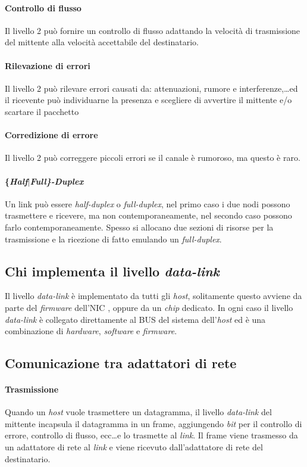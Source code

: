         \paragraph{Controllo di flusso} Il livello 2 può fornire un controllo di flusso adattando la velocità di trasmissione del mittente alla velocità accettabile del destinatario.
        \paragraph{Rilevazione di errori} Il livello 2 può rilevare errori causati da: attenuazioni, rumore e interferenze,\dots ed il ricevente può individuarne la presenza e scegliere di avvertire il mittente e/o scartare il pacchetto
        \paragraph{Corredizione di errore} Il livello 2 può correggere piccoli errori se il canale è rumoroso, ma questo è raro.
        \paragraph{\{\textit{Half}$\mid$\textit{Full\}-Duplex}} Un link può essere \textit{half-duplex} o \textit{full-duplex}, nel primo caso i due nodi possono trasmettere e ricevere, ma non contemporaneamente, nel secondo caso possono farlo contemporaneamente. Spesso si allocano due sezioni di risorse per la trasmissione e la ricezione di fatto emulando un \textit{full-duplex}.
    \subsection{Chi implementa il livello \textit{data-link}}
        Il livello \textit{data-link} è implementato da tutti gli \textit{host}, solitamente questo avviene da parte del \textit{firmware} dell'\Acrfull*{NIC} , oppure da un \textit{chip} dedicato. In ogni caso il livello \textit{data-link} è collegato direttamente al \Acrshort*{BUS} del sistema dell'\textit{host} ed è una combinazione di \textit{hardware}, \textit{software} e \textit{firmware}.
    \subsection{Comunicazione tra adattatori di rete} 
        \paragraph{Trasmissione} Quando un \textit{host} vuole trasmettere un datagramma, il livello \textit{data-link} del mittente incapsula il datagramma in un frame, aggiungendo \textit{bit} per il controllo di errore, controllo di flusso, ecc\dots e lo trasmette al \textit{link}. Il frame viene trasmesso da un adattatore di rete al \textit{link} e viene ricevuto dall'adattatore di rete del destinatario.
